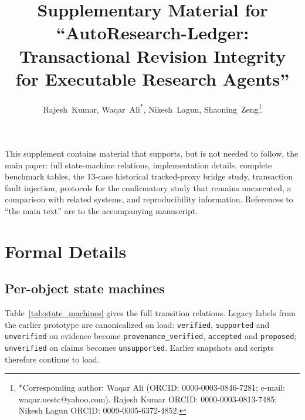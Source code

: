 \documentclass[journal]{IEEEtran}
\title{Supplementary Material for ``AutoResearch-Ledger: Transactional Revision Integrity for Executable Research Agents''}
\author{Rajesh~Kumar, Waqar~Ali\textsuperscript{*}, Nikesh~Lagun, Shaoning~Zeng\thanks{*Corresponding author: Waqar Ali (ORCID: 0000-0003-0846-7281; e-mail: waqar.uestc@yahoo.com). Rajesh Kumar ORCID: 0000-0003-0813-7485; Nikesh Lagun ORCID: 0009-0005-6372-4852.}}
\begin{document}
\maketitle

\noindent This supplement contains material that supports, but is not needed to follow, the main paper: full state-machine relations, implementation details, complete benchmark tables, the 13-case historical tracked-proxy bridge study, transaction fault injection, protocols for the confirmatory study that remains unexecuted, a comparison with related systems, and reproducibility information. References to ``the main text'' are to the accompanying manuscript.

\section{Formal Details}
\subsection{Per-object state machines}
Table~\ref{tab:state_machines} gives the full transition relations. Legacy labels from the earlier prototype are canonicalized on load: \texttt{verified}, \texttt{supported} and \texttt{unverified} on evidence become \texttt{provenance\_verified}, \texttt{accepted} and \texttt{proposed}; \texttt{unverified} on claims becomes \texttt{unsupported}. Earlier snapshots and scripts therefore continue to load.
\end{document}
